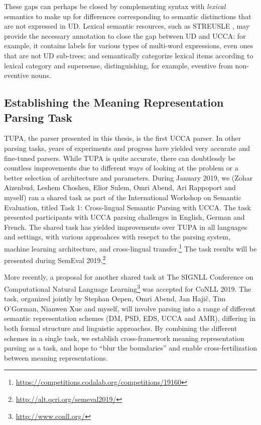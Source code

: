 \documentclass[12pt,a4paper]{report}
\begin{document}
These gaps can perhaps be closed
by complementing syntax with \textit{lexical} semantics to make up for differences
corresponding to semantic distinctions that are not expressed in UD.
Lexical semantic resources, such as STREUSLE
\citep{schneider-thesis,envmwe,pssdisambig,gensuper},
may provide the necessary annotation to close the gap between UD and UCCA:
for example, it contains labels for various types of multi-word expressions,
even ones that are not UD sub-trees;
and semantically categorize lexical items according to lexical category and
supersense, distinguishing, for example, eventive from non-eventive nouns.

\subsection*{Establishing the Meaning Representation Parsing Task}

TUPA, the parser presented in this thesis, is the first UCCA parser.
In other parsing tasks, years of experiments and progress have yielded very
accurate and fine-tuned parsers.
While TUPA is quite accurate, there can doubtlessly be countless improvements
due to different ways of looking at the problem or a better selection of architecture
and parameters.
During January 2019, we (Zohar Aizenbud, Leshem Choshen, Elior Sulem, Omri Abend,
Ari Rappoport and myself) ran a shared task as part of the
International Workshop on Semantic Evaluation, titled
Task 1: Cross-lingual Semantic Parsing with UCCA.
The task presented participants with UCCA parsing challenges
in English, German and French.
The shared task has yielded improvements over TUPA
in all languages and settings,
with various approahces with resepct to the parsing system,
machine learning architecture, and cross-lingual
transfer.\footnote{\url{https://competitions.codalab.org/competitions/19160}}
The task results will be presented during SemEval
2019.\footnote{\url{http://alt.qcri.org/semeval2019/}}

More recently, a proposal for another shared task at
The SIGNLL Conference on Computational Natural Language
Learning\footnote{\url{http://www.conll.org/}} was accepted for CoNLL 2019.
The task, organized jointly by Stephan Oepen, Omri Abend, Jan Haji\v{c},
Tim O'Gorman, Nianwen Xue and myself,
will involve parsing into a range of different semantic representation schemes
(DM, PSD, EDS, UCCA and AMR), differing in both formal structure and linguistic
approaches.
By combining the different schemes in a single task, we
establish cross-framework meaning representation parsing as a task,
and hope to ``blur the boundaries'' and enable cross-fertilization between
meaning representations.
\end{document}

